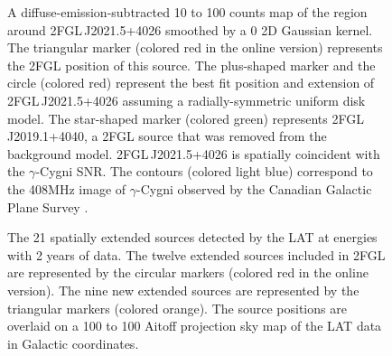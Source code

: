 \documentclass[12pt,preprint]{aastex}
\newif\ifcolorfigure
\newcommand{\mev}{\text{MeV}\xspace}
\newcommand{\gev}{\text{GeV}\xspace}
\begin{document}
\begin{figure}
    \ifcolorfigure
      \plotone{source_plots/source_Gamma_Cygni_color.eps}
    \else
    \fi
  \caption{A diffuse-emission-subtracted 
  10 \gev to 100 \gev counts map of the
  region around 2FGL\,J2021.5+4026 smoothed by a 0 2D Gaussian
  kernel. The triangular marker (colored red in the online version)
  represents the 2FGL position of this source.  The plus-shaped
  marker and the circle (colored red) represent the best fit position
  and extension of 2FGL\,J2021.5+4026 assuming a radially-symmetric
  uniform disk model.  
  The star-shaped marker (colored green)
  represents 2FGL\,J2019.1+4040,
  a 2FGL source that was removed from the background model.
  2FGL\,J2021.5+4026
  is spatially coincident with the $\gamma$-Cygni SNR.  The contours
  (colored light blue) correspond to the 408MHz image of $\gamma$-Cygni
  observed by the Canadian Galactic Plane Survey \citep{canadian_galactic_plane_survey}.
  }\label{1FGL_J2020.0+4049}
\end{figure}


\clearpage
  \begin{figure}
      \ifcolorfigure
      \plotone{summary_plots/allsky_extended_sources_color.eps}
      \else
      \fi
      \caption{The 21
      spatially extended sources detected by the LAT
      at \gev energies 
      with 2 years of data.  The twelve extended sources included in
      2FGL are represented by the circular markers (colored red in the online
      version).  The nine new extended sources are represented by
      the triangular markers (colored orange).
      The source positions are overlaid on a 100 \mev to 100 \gev 
      Aitoff projection sky map of the LAT data in Galactic coordinates.
}
\label{allsky_extended_sources}
  \end{figure}
\end{document}
